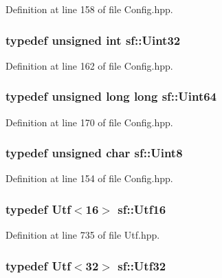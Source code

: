 Definition at line 158 of file Config.\-hpp.

\hypertarget{namespacesf_aa746fb1ddef4410bddf198ebb27e727c}{
\subsubsection[{Uint32}]{\setlength{\rightskip}{0pt plus 5cm}typedef unsigned int {\bf sf\-::\-Uint32}}}\label{namespacesf_aa746fb1ddef4410bddf198ebb27e727c}


Definition at line 162 of file Config.\-hpp.

\hypertarget{namespacesf_add9ac83466d96b9f50a009b9f4064266}{
\subsubsection[{Uint64}]{\setlength{\rightskip}{0pt plus 5cm}typedef unsigned long long {\bf sf\-::\-Uint64}}}\label{namespacesf_add9ac83466d96b9f50a009b9f4064266}


Definition at line 170 of file Config.\-hpp.

\hypertarget{namespacesf_a4ef3d630785c4f296f9b4f274c33d78e}{
\subsubsection[{Uint8}]{\setlength{\rightskip}{0pt plus 5cm}typedef unsigned char {\bf sf\-::\-Uint8}}}\label{namespacesf_a4ef3d630785c4f296f9b4f274c33d78e}


Definition at line 154 of file Config.\-hpp.

\hypertarget{namespacesf_ae30b6ea05a1723d608853ebc3043e53d}{
\subsubsection[{Utf16}]{\setlength{\rightskip}{0pt plus 5cm}typedef {\bf Utf}$<$16$>$ {\bf sf\-::\-Utf16}}}\label{namespacesf_ae30b6ea05a1723d608853ebc3043e53d}


Definition at line 735 of file Utf.\-hpp.

\hypertarget{namespacesf_a51a40f697607908d2e9f58e67f4c89a3}{
\subsubsection[{Utf32}]{\setlength{\rightskip}{0pt plus 5cm}typedef {\bf Utf}$<$32$>$ {\bf sf\-::\-Utf32}}}\label{namespacesf_a51a40f697607908d2e9f58e67f4c89a3}



